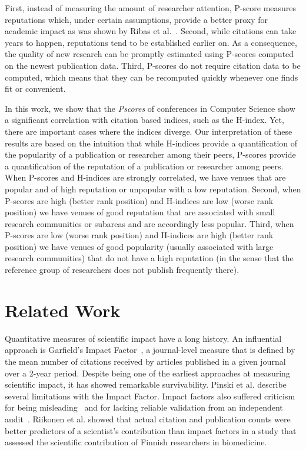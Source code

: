 \documentclass[notitlepage]{svjour3}
\begin{document}
First, instead of measuring the amount of researcher attention, P-score measures reputations
which, under certain assumptions, provide a better proxy for academic impact as was shown by 
Ribas et al.~\cite{Ribas2015a}. Second, while citations can take years to happen, reputations 
tend to be established earlier on. As a consequence, the quality of new research can be 
promptly estimated using P-scores computed on the newest publication data. Third, P-scores do
not require citation data to be computed, which means that they can be recomputed quickly whenever 
one finds fit or convenient.

In this work, we show that the {\em Pscores} of conferences in Computer Science show a significant 
correlation with citation based indices, such as the H-index. Yet, there are important cases where 
the indices diverge. 
Our interpretation of these results are based on the intuition that while H-indices provide a 
quantification of the popularity of a publication or researcher among their peers, P-scores 
provide a quantification of the reputation of a publication or researcher among peers. When
P-scores and H-indices are strongly correlated, we have venues that are popular and of high
reputation or unpopular with a low reputation. Second, when P-scores are high (better rank position) 
and H-indices are low (worse rank position) we have venues of good reputation
that are associated with small research communities or subareas and are accordingly less popular. Third, when P-scores
are low (worse rank position) and H-indices are high (better rank position) we have venues of good popularity 
(usually associated with large research communities) that do not have
a high reputation (in the sense that the reference group of researchers does not publish frequently there).

\section{Related Work}\label{sec:related-work}

Quantitative measures of scientific impact have a long history. An influential approach is
Garfield's Impact Factor~\cite{Garfield1955a}, a journal-level measure that is defined
by the mean number of citations received by articles published in a given journal over a 2-year period. 
Despite being one of the earliest approaches at measuring scientific impact, it has showed remarkable 
survivability. 
Pinski et al. \cite{Pinski1976} describe several limitations with the Impact Factor. Impact factors also suffered 
criticism for being misleading~\cite{Nature2016,Saha2003} and for lacking reliable validation from an independent 
audit~\cite{Rossner2007}. Riikonen et al. \cite{Riikonen2008} showed that actual citation 
and publication counts were better predictors of a scientist's contribution than impact factors in a 
study that assessed the scientific contribution of Finnish researchers in biomedicine.
\end{document}
